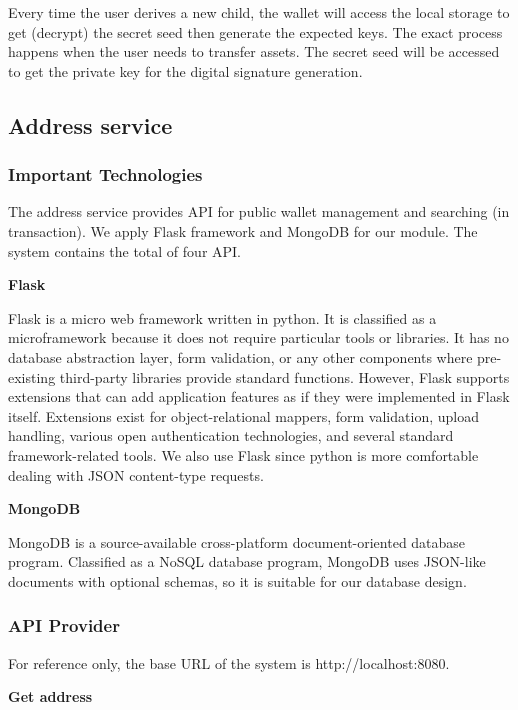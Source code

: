 Every time the user derives a new child, the wallet will access the local storage to get (decrypt) the secret seed then generate the expected keys. The exact process happens when the user needs to transfer assets. The secret seed will be accessed to get the private key for the digital signature generation.


\subsection{Address service}

\label{address}
\subsubsection{Important Technologies}

The address service provides API for public wallet management and searching (in transaction). We apply Flask framework and MongoDB for our module. The system contains the total of four API.

\bigskip
{\textbf{Flask}}

Flask \cite{grinberg2018flask} is a micro web framework written in python. It is classified as a microframework because it does not require particular tools or libraries. It has no database abstraction layer, form validation, or any other components where pre-existing third-party libraries provide standard functions. However, Flask supports extensions that can add application features as if they were implemented in Flask itself. Extensions exist for object-relational mappers, form validation, upload handling, various open authentication technologies, and several standard framework-related tools. We also use Flask since python is more comfortable dealing with JSON content-type requests.


\bigskip
{\textbf{MongoDB}}

MongoDB \cite{mongo} is a source-available cross-platform document-oriented database program. Classified as a NoSQL database program, MongoDB uses JSON-like documents with optional schemas, so it is suitable for our database design.

\bigskip
\subsubsection{API Provider}

For reference only, the base URL of the system is http://localhost:8080.

{\textbf{Get address}}

